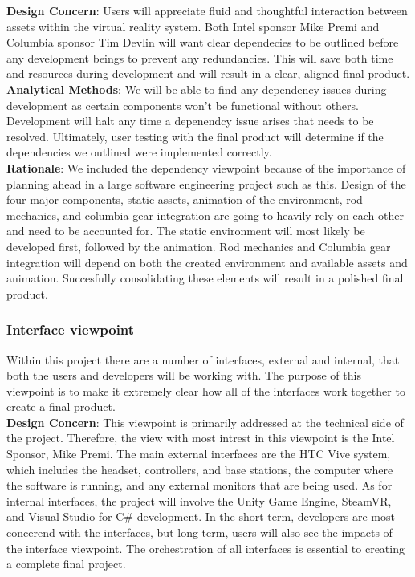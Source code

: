 \documentclass[10pt,journal,compsoc,onecolumn, draftclsnofoot]{IEEEtran}
\begin{document}
\hangindent=0.5cm \textbf{Design Concern}: Users will appreciate fluid and thoughtful interaction between assets within the virtual reality system. Both Intel sponsor Mike Premi and Columbia sponsor Tim Devlin will want clear dependecies to be outlined before any development beings to prevent any redundancies. This will save both time and resources during development and will result in a clear, aligned final product.\\

\hangindent=0.5cm \textbf{Analytical Methods}: We will be able to find any dependency issues during development as certain components won't be functional without others. Development will halt any time a depenendcy issue arises that needs to be resolved. Ultimately, user testing with the final product will determine if the dependencies we outlined were implemented correctly.\\

\hangindent=0.5cm \textbf{Rationale}: We included the dependency viewpoint because of the importance of planning ahead in a large software engineering project such as this. Design of the four major components, static assets, animation of the environment, rod mechanics, and columbia gear integration are going to heavily rely on each other and need to be accounted for. The static environment will most likely be developed first, followed by the animation. Rod mechanics and Columbia gear integration will depend on both the created environment and available assets and animation. Succesfully consolidating these elements will result in a polished final product.\\

\subsubsection{Interface viewpoint}
Within this project there are a number of interfaces, external and internal, that both the users and developers will be working with.
The purpose of this viewpoint is to make it extremely clear how all of the interfaces work together to create a final product. \\

\hangindent=0.5cm \textbf{Design Concern}: This viewpoint is primarily addressed at the technical side of the project.
Therefore, the view with most intrest in this viewpoint is the Intel Sponsor, Mike Premi.
The main external interfaces are the HTC Vive system, which includes the headset, controllers, and base stations, the computer where the software is running, and any external monitors that are being used.
As for internal interfaces, the project will involve the Unity Game Engine, SteamVR, and Visual Studio for C\# development.
In the short term, developers are most concerend with the interfaces, but long term, users will also see the impacts of the interface viewpoint.
The orchestration of all interfaces is essential to creating a complete final project. \\
\end{document}
